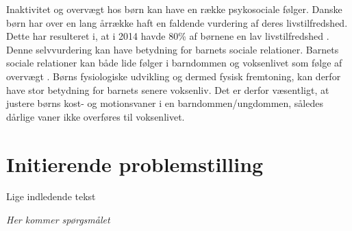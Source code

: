 Inaktivitet og overvægt hos børn kan have en række psykosociale følger. Danske børn har over en lang årrække haft en faldende vurdering af deres livstilfredshed. Dette har resulteret i, at i 2014 havde 80\% af børnene en lav livstilfredshed \citep{SKOLEBØRNSUNDERSØGELSEN}. Denne selvvurdering kan have betydning for barnets sociale relationer. Barnets sociale relationer kan både lide følger i barndommen og voksenlivet som følge af overvægt \citep{www.si-folkesundhed.dk/upload/kap_21_overvægt_og_fedme.pdf}. \newline
Børns fysiologiske udvikling og dermed fysisk fremtoning, kan derfor have stor betydning for barnets senere voksenliv. Det er derfor væsentligt, at justere børns kost- og motionsvaner i en barndommen/ungdommen, således dårlige vaner ikke overføres til voksenlivet. 

\section{Initierende problemstilling}
Lige indledende tekst

\textit{Her kommer spørgsmålet}